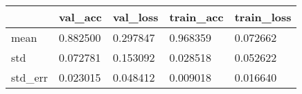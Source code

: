 \begin{tabular}{|l|l|l|l|l|}
\toprule \hline
 & val\_acc & val\_loss & train\_acc & train\_loss \\ \hline
\midrule
mean & 0.882500 & 0.297847 & 0.968359 & 0.072662 \\ \hline
std & 0.072781 & 0.153092 & 0.028518 & 0.052622 \\ \hline
std\_err & 0.023015 & 0.048412 & 0.009018 & 0.016640 \\ \hline
\bottomrule
\end{tabular}
